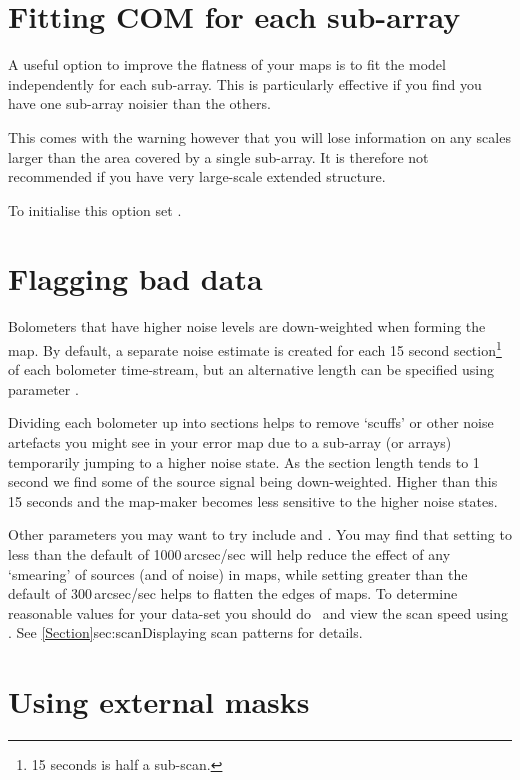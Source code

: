 \section{Fitting COM for each sub-array}
\label{sec:fitcom}

A useful option to improve the flatness of your maps is to fit the
 model independently for each sub-array. This is
particularly effective if you find you have one sub-array noisier than
the others.

This comes with the warning however that you will lose information on
any scales larger than the area covered by a single sub-array. It is
therefore not recommended if you have very large-scale extended
structure.

To initialise this option set .


\section{Flagging bad data}
\label{sec:noibox}

Bolometers that have higher noise levels are down-weighted when forming
the map. By default, a separate noise estimate is created for each
15 second section\footnote{15 seconds is half a sub-scan.} of each bolometer
time-stream, but an alternative length can be specified using parameter
.

Dividing each bolometer up into sections helps to remove `scuffs' or other
noise artefacts you might see in your error map due to a sub-array (or
arrays) temporarily jumping to a higher noise state. As the section length
tends to 1 second we find some of the source signal being down-weighted.
Higher than this 15 seconds and the map-maker becomes less sensitive to
the higher noise states.

Other parameters you may want to try include  and
. You may find that setting  to less
than the default of 1000\,arcsec/sec will help reduce the effect of any
`smearing' of sources (and of noise) in maps, while setting
 greater than the default of 300\,arcsec/sec helps to
flatten the edges of maps. To determine reasonable values for your
 data-set you should do \jcmtstate\ and view the scan speed using
\topcat. See \cref{Section}{sec:scan}{Displaying scan patterns} for
details.


\section{Using external masks}
\label{sec:maskbe}

